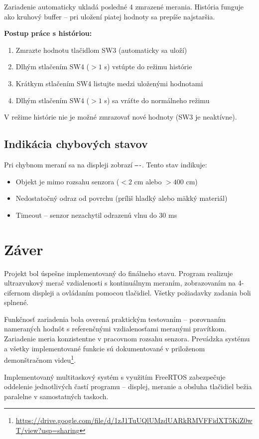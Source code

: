 \documentclass[a4paper, 11pt]{article}
\begin{document}
Zariadenie automaticky ukladá posledné 4 zmrazené merania. História funguje ako kruhový buffer -- pri uložení piatej hodnoty sa prepíše najstaršia.

\textbf{Postup práce s históriou:}
\begin{enumerate}
    \item Zmrazte hodnotu tlačidlom SW3 (automaticky sa uloží)
    \item Dlhým stlačením SW4 ($>1$ s) vstúpte do režimu histórie
    \item Krátkym stlačením SW4 listujte medzi uloženými hodnotami
    \item Dlhým stlačením SW4 ($>1$ s) sa vráťte do normálneho režimu
\end{enumerate}

V režime histórie nie je možné zmrazovať nové hodnoty (SW3 je neaktívne).

\subsection{Indikácia chybových stavov}

Pri chybnom meraní sa na displeji zobrazí \texttt{----}. Tento stav indikuje:
\begin{itemize}
    \item Objekt je mimo rozsahu senzora ($< 2$ cm alebo $> 400$ cm)
    \item Nedostatočný odraz od povrchu (príliš hladký alebo mäkký materiál)
    \item Timeout -- senzor nezachytil odrazenú vlnu do 30 ms
\end{itemize}


\section{Záver}

Projekt bol úspešne implementovaný do finálneho stavu. Program realizuje ultrazvukový merač vzdialenosti s kontinuálnym meraním, zobrazovaním na 4-cifernom displeji a ovládaním pomocou tlačidiel. Všetky požiadavky zadania boli splnené.

Funkčnosť zariadenia bola overená praktickým testovaním -- porovnaním nameraných hodnôt s referenčnými vzdialenosťami meranými pravítkom. Zariadenie meria konzistentne v pracovnom rozsahu senzora. Prevádzka systému a všetky implementované funkcie sú dokumentované v priloženom demonštračnom videu\footnote{\url{https://drive.google.com/file/d/1zJ1TuUQlUMzdUARkRMVFFidXT5KiZ0wT/view?usp=sharing}}.

Implementovaný multitaskový systém s využitím FreeRTOS zabezpečuje oddelenie jednotlivých častí programu -- displej, meranie a obsluha tlačidiel bežia paralelne v samostatných taskoch.
\end{document}
